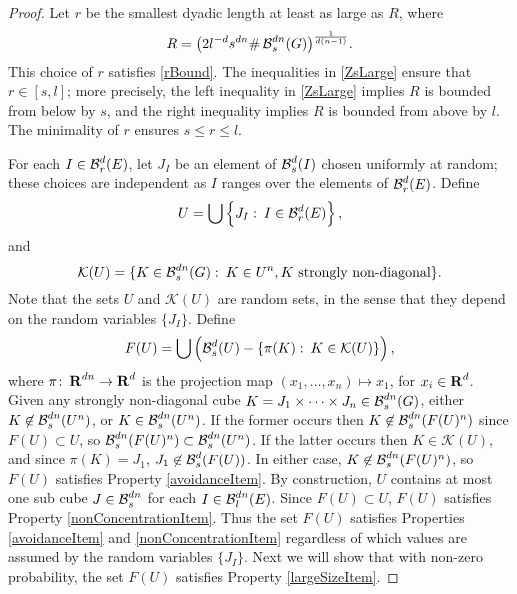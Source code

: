 \begin{proof}
	Let $r$ be the smallest dyadic length at least as large as $R$, where
	\begin{equation} \label{What-is-r}
		R = \big(2 l^{-d}s^{dn}\# \operatorname{\mathcal{B}}^{dn}_s(G)\big)^{\frac{1}{d(n-1)}}.
	\end{equation} 
	This choice of $r$ satisfies \eqref{rBound}. 
	The inequalities in \eqref{ZsLarge} ensure that $r \in [s,l]$; more precisely, the left inequality in \eqref{ZsLarge} implies $R$ is bounded from below by $s$, and the right inequality implies $R$ is bounded from above by $l$. The minimality of $r$ ensures $s \leq r \leq l$.

	For each $I \in \operatorname{\mathcal{B}}_r^d(E)$, let $J_I$ be an element of $\operatorname{\mathcal{B}}^d_s(I)$ chosen uniformly at random; these choices are independent as $I$ ranges over the elements of $\operatorname{\mathcal{B}}_r^d(E)$. Define
	\[ 	U = \bigcup \left\{ J_I \operatorname{\colon} I \in \operatorname{\mathcal{B}}_r^d(E) \right\}, \]
	and
	\[ \mathcal{K}(U) = \{ K \in \operatorname{\mathcal{B}}^{dn}_s(G) \operatorname{\colon} K \in U^n, \text{$K$ strongly non-diagonal} \}. \]
	Note that the sets $U$ and $\mathcal{K}(U)$ are random sets, in the sense that they depend on the random variables $\{ J_I \}$. Define
	\begin{equation} \label{defnOfF}
		F(U) = \bigcup \left( \operatorname{\mathcal{B}}^d_s(U) - \{ \pi(K) \operatorname{\colon} K \in \mathcal{K}(U) \} \right),
	\end{equation}
	where $\pi \colon \operatorname{\mathbf{R}}^{dn} \to \operatorname{\mathbf{R}}^d$ is the projection map $(x_1, \dots, x_n) \mapsto x_1$, for $x_i \in \operatorname{\mathbf{R}}^d$. Given any strongly non-diagonal cube $K = J_1 \times \cdots \times J_n \in \operatorname{\mathcal{B}}_s^{dn}(G)$, either $K \not \in \operatorname{\mathcal{B}}_s^{dn}(U^n)$, or $K \in \operatorname{\mathcal{B}}_s^{dn}(U^n)$. If the former occurs then $K \not \in \operatorname{\mathcal{B}}_s^{dn}(F(U)^n)$ since $F(U) \subset U$, so $\operatorname{\mathcal{B}}_s^{dn}(F(U)^n) \subset \operatorname{\mathcal{B}}_s^{dn}(U^n)$. If the latter occurs then $K \in \mathcal{K}(U)$, and since $\pi(K) = J_1$, $J_1 \not \in \operatorname{\mathcal{B}}_s^d(F(U))$. In either case, $K \not \in \operatorname{\mathcal{B}}_s^{dn}(F(U)^n)$, so $F(U)$ satisfies Property \ref{avoidanceItem}. By construction, $U$ contains at most one sub cube $J \in \operatorname{\mathcal{B}}^{dn}_s$ for each $I \in \operatorname{\mathcal{B}}^{dn}_l(E)$. Since $F(U) \subset U$, $F(U)$ satisfies Property \ref{nonConcentrationItem}. Thus the set $F(U)$ satisfies Properties \ref{avoidanceItem} and \ref{nonConcentrationItem} regardless of which values are assumed by the random variables $\{ J_I \}$. Next we will show that with non-zero probability, the set $F(U)$ satisfies Property \ref{largeSizeItem}. 


\end{proof}

